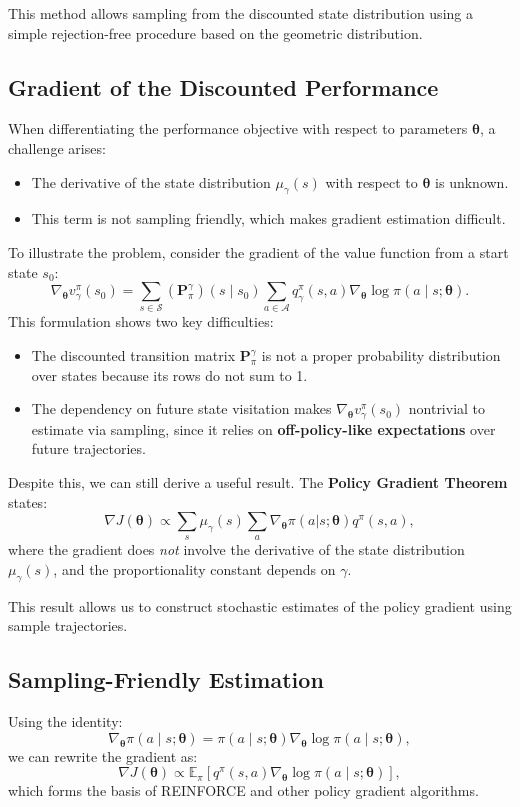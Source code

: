 This method allows sampling from the discounted state distribution using a simple rejection-free procedure based on the geometric distribution.

\subsection{Gradient of the Discounted Performance}
When differentiating the performance objective with respect to parameters \( \boldsymbol{\theta} \), a challenge arises:
\begin{itemize}
    \item The derivative of the state distribution \( \mu_{\gamma}(s) \) with respect to \( \boldsymbol{\theta} \) is unknown.
    \item This term is not sampling friendly, which makes gradient estimation difficult.
\end{itemize}

To illustrate the problem, consider the gradient of the value function from a start state \( s_0 \):
\[
\nabla_{\boldsymbol{\theta}} v^{\pi}_{\gamma}(s_0)
= \sum_{s \in \mathcal{S}} (\mathbf{P}_{\pi}^{\gamma})(s \mid s_0) \sum_{a \in \mathcal{A}} q_{\gamma}^{\pi}(s, a) \nabla_{\boldsymbol{\theta}} \log \pi(a \mid s; \boldsymbol{\theta}).
\]
This formulation shows two key difficulties:
\begin{itemize}
    \item The discounted transition matrix \( \mathbf{P}_{\pi}^{\gamma} \) is not a proper probability distribution over states because its rows do not sum to 1.
    \item The dependency on future state visitation makes \( \nabla_{\boldsymbol{\theta}} v^{\pi}_{\gamma}(s_0) \) nontrivial to estimate via sampling, since it relies on \textbf{off-policy-like expectations} over future trajectories.
\end{itemize}

Despite this, we can still derive a useful result. The \textbf{Policy Gradient Theorem} states:
\[
\nabla J(\boldsymbol{\theta}) \propto \sum_{s} \mu_{\gamma}(s) \sum_{a} \nabla_{\boldsymbol{\theta}} \pi(a|s; \boldsymbol{\theta}) q^{\pi}(s,a),
\]
where the gradient does \emph{not} involve the derivative of the state distribution \( \mu_{\gamma}(s) \), and the proportionality constant depends on \( \gamma \).

This result allows us to construct stochastic estimates of the policy gradient using sample trajectories.

\subsection{Sampling-Friendly Estimation}
Using the identity:
\[
\nabla_{\boldsymbol{\theta}} \pi(a \mid s; \boldsymbol{\theta}) = \pi(a \mid s; \boldsymbol{\theta}) \nabla_{\boldsymbol{\theta}} \log \pi(a \mid s; \boldsymbol{\theta}),
\]
we can rewrite the gradient as:
\[
\nabla J(\boldsymbol{\theta}) \propto \mathbb{E}_{\pi} \left[ q^{\pi}(s,a) \nabla_{\boldsymbol{\theta}} \log \pi(a \mid s; \boldsymbol{\theta}) \right],
\]
which forms the basis of REINFORCE and other policy gradient algorithms.

